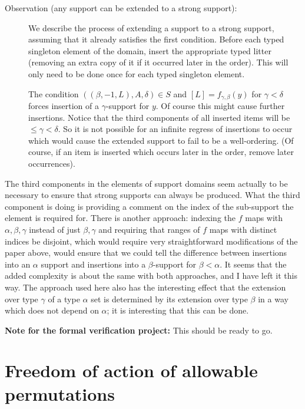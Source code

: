 \begin{description}
\item[Observation (any support can be extended to a strong support):]  We describe the process of extending a support to a strong support, assuming that it already satisfies the first condition.  Before each typed singleton element of the domain, insert the appropriate typed litter (removing an extra copy of it if it occurred later in the order).  This will only need to be done once for each typed singleton element.

The condition $((\beta,-1,L),A,\delta) \in S$ and $[L]=f_{\gamma,\beta}(y)$ for $\gamma<\delta$ forces insertion of a $\gamma$-support for $y$.  Of course this might cause further insertions.  Notice that
the third components of all inserted items will be $\leq \gamma <\delta$.  So it is not possible for an infinite regress of insertions to occur which would cause the extended support to fail to be a well-ordering.  (Of course, if an item is inserted which occurs later in the order, remove later occurrences).

\end{description}

The third components in the elements of support domains seem actually to be necessary to ensure that strong supports can always be produced.  What the third component is doing is providing a comment on the index of the sub-support the element is required for.   There is another approach:  indexing the $f$ maps with $\alpha,\beta,\gamma$ instead of just $\beta,\gamma$ and requiring that ranges of $f$ maps with distinct indices be disjoint, which would require very straightforward modifications of the paper above, would ensure that we could tell the difference between insertions into an $\alpha$ support and insertions into a $\beta$-support for $\beta<\alpha$.  It seems that the added complexity is about the same with both approaches, and I have left it this way.  The approach used here also has the interesting effect that the extension over type $\gamma$ of a type $\alpha$ set is determined by its extension over type $\beta$ in a way which does not depend on $\alpha$;  it is interesting that this can be done.


{\bf Note for the formal verification project:}  This should be ready to go.
\newpage
\section{Freedom of action of allowable permutations}

